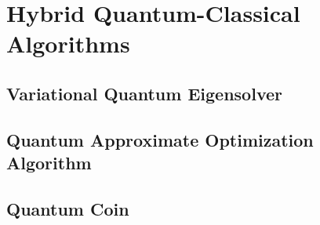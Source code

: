 \chapter[Hybrid Quantum-Classical Algorithms]{Hybrid Quantum-Classical\\Algorithms} \label{chap:hybrid-quantum-classical-algorithms}

\section{Variational Quantum Eigensolver}

\section{Quantum Approximate Optimization Algorithm}

\section{Quantum Coin}